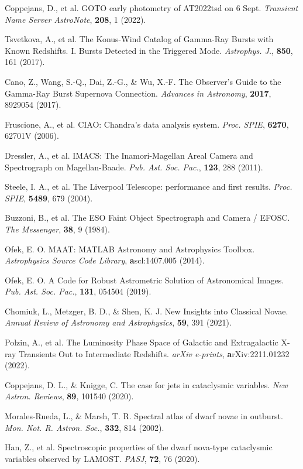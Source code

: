 \documentclass{nature_plusfigure}
\newcommand{\mn}{{Mon. Not. R. Astron. Soc.}}
\newcommand{\nar}{{New Astron. Reviews}}
\newcommand{\mnras}{\mn}
\newcommand{\apj}{{Astrophys. J.}}
\newcommand{\pasj}{{PASJ}}
\newcommand{\pasp}{{Pub. Ast. Soc. Pac.}}
\newcommand{\procspie}{Proc. SPIE}
\newcommand{\araa}{Annual Review of Astronomy and Astrophysics}
\begin{document}
\begin{methods}
\begin{thebibliography}{10}
 Coppejans, D., et al. GOTO early photometry of AT2022tsd on 6 Sept. \emph{Transient Name Server AstroNote}, \textbf{208}, 1 (2022). 

 Tsvetkova, A., et al. The Konus-Wind Catalog of Gamma-Ray Bursts with Known Redshifts. I. Bursts Detected in the Triggered Mode. \emph{\apj}, \textbf{850}, 161 (2017). 

 Cano, Z., Wang, S.-Q., Dai, Z.-G., \& Wu, X.-F. The Observer's Guide to the Gamma-Ray Burst Supernova Connection. \emph{Advances in Astronomy}, \textbf{2017}, 8929054 (2017). 

 Fruscione, A., et al. CIAO: Chandra's data analysis system. \emph{\procspie}, \textbf{6270}, 62701V (2006). 

 Dressler, A., et al. IMACS: The Inamori-Magellan Areal Camera and Spectrograph on Magellan-Baade. \emph{\pasp}, \textbf{123}, 288 (2011). 

 Steele, I. A., et al. The Liverpool Telescope: performance and first results. \emph{\procspie}, \textbf{5489}, 679 (2004). 

 Buzzoni, B., et al. The ESO Faint Object Spectrograph and Camera / EFOSC. \emph{The Messenger}, \textbf{38}, 9 (1984). 

 Ofek, E. O. MAAT: MATLAB Astronomy and Astrophysics Toolbox. \emph{Astrophysics Source Code Library}, \textbf ascl:1407.005 (2014). 

 Ofek, E. O. A Code for Robust Astrometric Solution of Astronomical Images. \emph{\pasp}, \textbf{131}, 054504 (2019). 

 Chomiuk, L., Metzger, B. D., \& Shen, K. J. New Insights into Classical Novae. \emph{\araa}, \textbf{59}, 391 (2021). 

 Polzin, A., et al. The Luminosity Phase Space of Galactic and Extragalactic X-ray Transients Out to Intermediate Redshifts. \emph{arXiv e-prints}, \textbf arXiv:2211.01232 (2022). 

 Coppejans, D. L., \& Knigge, C. The case for jets in cataclysmic variables. \emph{\nar}, \textbf{89}, 101540 (2020). 

 Morales-Rueda, L., \& Marsh, T. R. Spectral atlas of dwarf novae in outburst. \emph{\mnras}, \textbf{332}, 814 (2002). 

 Han, Z., et al. Spectroscopic properties of the dwarf nova-type cataclysmic variables observed by LAMOST. \emph{\pasj}, \textbf{72}, 76 (2020). 


\end{thebibliography}
\end{methods}
\end{document}
